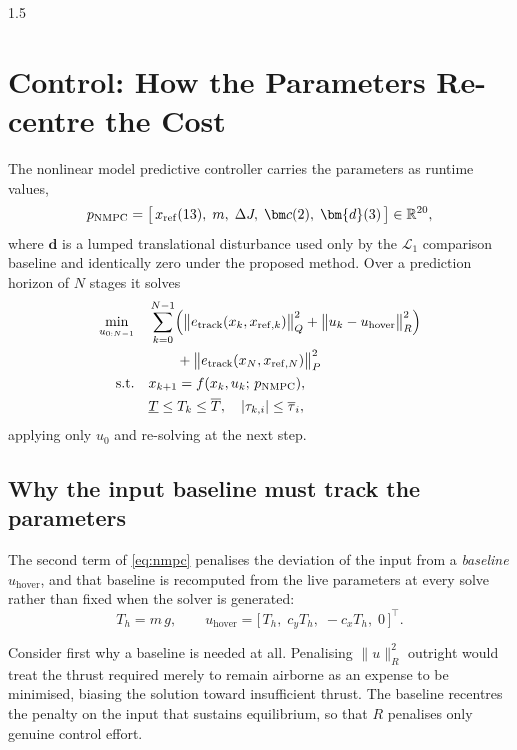 \begin{spacing}{1.5}
\section{Control: How the Parameters Re-centre the Cost}\label{sec:model:ctrl}

The nonlinear model predictive controller carries the parameters as
runtime values,
\begin{equation}
p_{\mathrm{NMPC}} = \bigl[\, x_{\mathrm{ref}}(13),\; m,\; \dJ,\; \cvec(2),\; \bm{d}(3) \,\bigr] \in \mathbb{R}^{20},
\label{eq:pnmpc}
\end{equation}
where $\bm{d}$ is a lumped translational disturbance used only by the
$\mathcal{L}_1$ comparison baseline and identically zero under the
proposed method. Over a prediction horizon of $N$ stages it solves
\begin{align}
\min_{u_{0:N-1}} \quad
& \sum_{k=0}^{N-1} \Bigl( \bigl\| e_{\mathrm{track}}(x_k, x_{\mathrm{ref},k}) \bigr\|^2_{Q}
+ \bigl\| u_k - u_{\mathrm{hover}} \bigr\|^2_{R} \Bigr) \nonumber \\
& \qquad + \bigl\| e_{\mathrm{track}}(x_N, x_{\mathrm{ref},N}) \bigr\|^2_{P} \nonumber \\
\mathrm{s.t.} \quad
& x_{k+1} = f(x_k, u_k;\, p_{\mathrm{NMPC}}), \nonumber \\
& \underline{T} \le T_k \le \overline{T}, \quad
  |\tau_{k,i}| \le \overline{\tau}_i ,
\label{eq:nmpc}
\end{align}
applying only $u_0$ and re-solving at the next step.

\subsection{Why the input baseline must track the parameters}\label{sec:model:hover}

The second term of \eqref{eq:nmpc} penalises the deviation of the input
from a \emph{baseline} $u_{\mathrm{hover}}$, and that baseline is
recomputed from the live parameters at every solve rather than fixed when
the solver is generated:
\begin{equation}
T_h = m\,g,
\qquad
u_{\mathrm{hover}} = \bigl[\, T_h,\; c_y T_h,\; -c_x T_h,\; 0 \,\bigr]^{\!\top}.
\label{eq:hover}
\end{equation}

Consider first why a baseline is needed at all. Penalising $\|u\|^2_R$
outright would treat the thrust required merely to remain airborne as an
expense to be minimised, biasing the solution toward insufficient thrust.
The baseline recentres the penalty on the input that sustains
equilibrium, so that $R$ penalises only genuine control effort.


\end{spacing}
